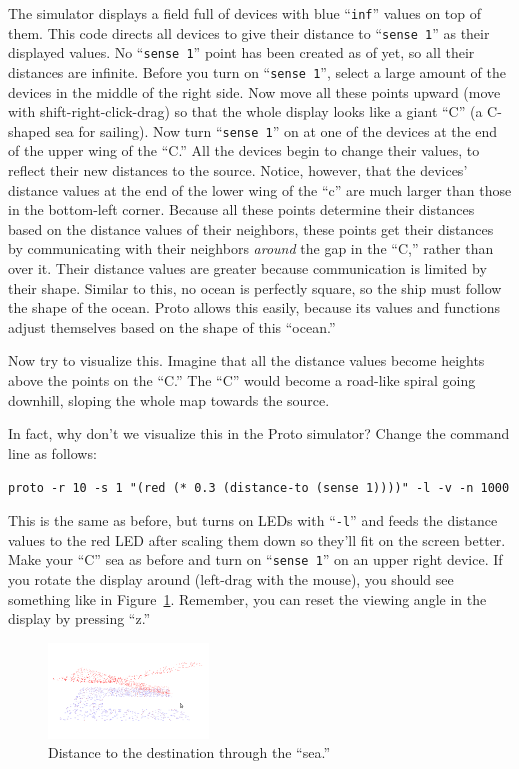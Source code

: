\documentclass{article}
\newcommand\code[1]{\begin{center}\var{#1}\end{center}}
\newcommand\var[1]{{\tt #1}}
\newcommand\qvar[1]{``{\tt #1}''}
\begin{document}
The simulator displays a field full of devices with blue \qvar{inf}
values on top of them.  This code directs all devices to give their
distance to \qvar{sense 1} as their displayed values.  No \qvar{sense
  1} point has been created as of yet, so all their distances are
infinite.  Before you turn on \qvar{sense 1}, select a large amount of
the devices in the middle of the right side. Now move all these points
upward (move with shift-right-click-drag) so that the whole display
looks like a giant ``C'' (a C-shaped sea for sailing).  Now turn
\qvar{sense 1} on at one of the devices at the end of the upper wing
of the ``C.''  All the devices begin to change their values, to
reflect their new distances to the source.  Notice, however, that the
devices' distance values at the end of the lower wing of the ``c'' are
much larger than those in the bottom-left corner.  Because all these
points determine their distances based on the distance values of their
neighbors, these points get their distances by communicating with
their neighbors {\em around} the gap in the ``C,'' rather than over it.
Their distance values are greater because communication is limited by
their shape.  Similar to this, no ocean is perfectly square, so the
ship must follow the shape of the ocean.  Proto allows this easily,
because its values and functions adjust themselves based on the shape
of this ``ocean.''

Now try to visualize this.  Imagine that all the distance values
become heights above the points on the ``C.''  The ``C'' would become
a road-like spiral going downhill, sloping the whole map towards the
source.

In fact, why don't we visualize this in the Proto simulator?  Change
the command line as follows:

\code{proto -r 10 -s 1 "(red (* 0.3 (distance-to (sense 1))))" -l -v -n 1000}

This is the same as before, but turns on LEDs with \qvar{-l} and feeds
the distance values to the red LED after scaling them down so they'll
fit on the screen better.  Make your ``C'' sea as before and turn on
\qvar{sense 1} on an upper right device.  If you rotate the display
around (left-drag with the mouse), you should see something like in
Figure~\ref{f:cdist}.  Remember, you can reset the viewing angle in
the display by pressing ``z.''

\begin{figure}
  \includegraphics[width=0.38\textwidth]{figures/c-sea-dist.png}
  \caption{Distance to the destination through the ``sea.''}
  \label{f:cdist}
\end{figure}
\end{document}
